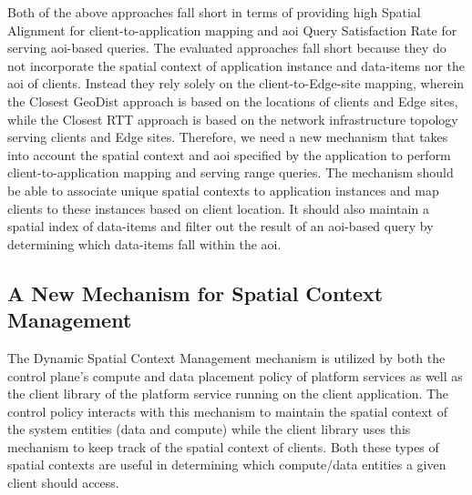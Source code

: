\par Both of the above approaches fall short in terms of providing high Spatial Alignment for client-to-application mapping and \gls{aoi} Query Satisfaction Rate for serving \gls{aoi}-based queries. The evaluated approaches fall short because they do not incorporate the spatial context of application instance and data-items nor the \gls{aoi} of clients. Instead they rely solely on the client-to-Edge-site mapping, wherein the Closest GeoDist approach is based on the locations of clients and Edge sites, while the Closest RTT approach is based on the network infrastructure topology serving clients and Edge sites. Therefore, we need a new mechanism that takes into account the spatial context and \gls{aoi} specified by the application to perform client-to-application mapping and serving range queries. The mechanism should be able to associate unique spatial contexts to application instances and map clients to these instances based on client location. It should also maintain a spatial index of data-items and filter out the result of an \gls{aoi}-based query by determining which data-items fall within the \gls{aoi}.

\subsection{A New Mechanism for Spatial Context Management}
The Dynamic Spatial Context Management mechanism is utilized by both the control plane's compute and data placement policy of platform services as well as the client library of the platform service running on the client application. The control policy interacts with this mechanism to maintain the spatial context of the system entities (data and compute) while the client library uses this mechanism to keep track of the spatial context of clients. Both these types of spatial contexts are useful in determining which compute/data entities a given client should access. 
